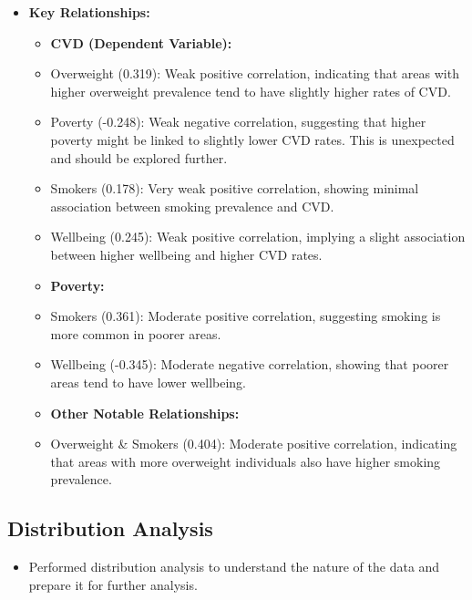 \documentclass[
]{article}
\providecommand{\tightlist}{%
  \setlength{\itemsep}{0pt}\setlength{\parskip}{0pt}}
\begin{document}
\begin{itemize}
\item
  \textbf{Key Relationships:}

  \begin{itemize}
  \item
    \textbf{CVD (Dependent Variable):}
  \item
    Overweight (0.319): Weak positive correlation, indicating that areas
    with higher overweight prevalence tend to have slightly higher rates
    of CVD.
  \item
    Poverty (-0.248): Weak negative correlation, suggesting that higher
    poverty might be linked to slightly lower CVD rates. This is
    unexpected and should be explored further.
  \item
    Smokers (0.178): Very weak positive correlation, showing minimal
    association between smoking prevalence and CVD.
  \item
    Wellbeing (0.245): Weak positive correlation, implying a slight
    association between higher wellbeing and higher CVD rates.
  \item
    \textbf{Poverty:}
  \item
    Smokers (0.361): Moderate positive correlation, suggesting smoking
    is more common in poorer areas.
  \item
    Wellbeing (-0.345): Moderate negative correlation, showing that
    poorer areas tend to have lower wellbeing.
  \item
    \textbf{Other Notable Relationships:}
  \item
    Overweight \& Smokers (0.404): Moderate positive correlation,
    indicating that areas with more overweight individuals also have
    higher smoking prevalence.
  \end{itemize}
\end{itemize}

\subsection{Distribution Analysis}\label{distribution-analysis}

\begin{itemize}
\tightlist
\item
  Performed distribution analysis to understand the nature of the data
  and prepare it for further analysis.
\end{itemize}
\end{document}
